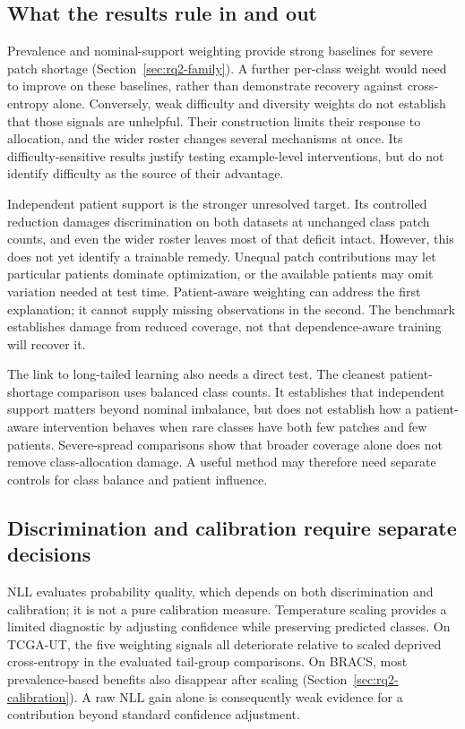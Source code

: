 \documentclass[11pt]{article}
\begin{document}
\subsection{What the results rule in and out}
\label{sec:discussion-evidence}
\label{sec:discussion-signal}
\label{sec:discussion-mechanism}
Prevalence and nominal-support weighting provide strong baselines for severe patch shortage (Section~\ref{sec:rq2-family}). A further per-class weight would need to improve on these baselines, rather than demonstrate recovery against cross-entropy alone. Conversely, weak difficulty and diversity weights do not establish that those signals are unhelpful. Their construction limits their response to allocation, and the wider roster changes several mechanisms at once. Its difficulty-sensitive results justify testing example-level interventions, but do not identify difficulty as the source of their advantage.

Independent patient support is the stronger unresolved target. Its controlled reduction damages discrimination on both datasets at unchanged class patch counts, and even the wider roster leaves most of that deficit intact. However, this does not yet identify a trainable remedy. Unequal patch contributions may let particular patients dominate optimization, or the available patients may omit variation needed at test time. Patient-aware weighting can address the first explanation; it cannot supply missing observations in the second. The benchmark establishes damage from reduced coverage, not that dependence-aware training will recover it.

The link to long-tailed learning also needs a direct test. The cleanest patient-shortage comparison uses balanced class counts. It establishes that independent support matters beyond nominal imbalance, but does not establish how a patient-aware intervention behaves when rare classes have both few patches and few patients. Severe-spread comparisons show that broader coverage alone does not remove class-allocation damage. A useful method may therefore need separate controls for class balance and patient influence.

\subsection{Discrimination and calibration require separate decisions}
\label{sec:discussion-ceiling}
NLL evaluates probability quality, which depends on both discrimination and calibration; it is not a pure calibration measure. Temperature scaling provides a limited diagnostic by adjusting confidence while preserving predicted classes. On TCGA-UT, the five weighting signals all deteriorate relative to scaled deprived cross-entropy in the evaluated tail-group comparisons. On BRACS, most prevalence-based benefits also disappear after scaling (Section~\ref{sec:rq2-calibration}). A raw NLL gain alone is consequently weak evidence for a contribution beyond standard confidence adjustment.
\end{document}
